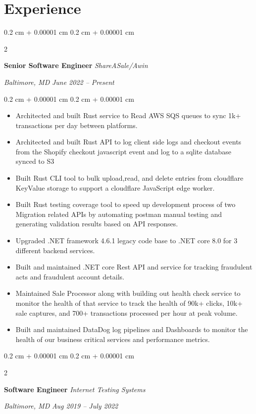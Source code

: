 \documentclass[10pt, letterpaper]{article}
\newenvironment{highlights}{
    \begin{itemize}[
        topsep=0.10 cm,
        parsep=0.10 cm,
        partopsep=0pt,
        itemsep=0pt,
        leftmargin=0.4 cm + 10pt
        ]
    }{
\end{itemize}
} %
\newenvironment{onecolentry}{
    \begin{adjustwidth}{
            0.2 cm + 0.00001 cm
        }{
            0.2 cm + 0.00001 cm
        }
    }{
    \end{adjustwidth}
} %
\newenvironment{twocolentry}[2][]{
    \onecolentry
    \def\secondColumn{#2}
    \setcolumnwidth{\fill, 10.5 cm}
    \begin{paracol}{2}
    }{
        \switchcolumn \raggedleft \secondColumn
    \end{paracol}
    \endonecolentry
} %
\begin{document}
\section{Experience}
\begin{twocolentry}{
    \textit{Baltimore, MD}
    \textit{June 2022 – Present}}
    \textbf{Senior Software Engineer}
    \textit{ShareASale/Awin}
\end{twocolentry}
\begin{onecolentry}
    \begin{highlights}
        \item Architected and built Rust service to Read AWS SQS queues to sync 1k+ transactions per day between platforms.
        \item Architected and built Rust API to log client side logs and checkout events from the Shopify checkout javascript event and log to a sqlite database synced to S3
        \item Built Rust CLI tool to bulk upload,read, and delete entries from cloudflare KeyValue storage to support a cloudflare JavaScript edge worker.
        \item Built Rust testing coverage tool to speed up development process of two Migration related APIs by automating postman manual testing and generating validation results based on API responses.
        \item Upgraded .NET framework 4.6.1 legacy code base to .NET core 8.0 for 3 different backend services.
        \item Built and maintained .NET core Rest API and service for tracking fraudulent acts and fraudulent account details.
        \item Maintained Sale Processor along with building out health check service to monitor the health of that service to track the health of 90k+ clicks, 10k+ sale captures, and 700+ transactions processed per hour at peak volume.
        \item Built and maintained DataDog log pipelines and Dashboards to monitor the health of our business critical services and performance metrics.
        \end{highlights}
    \end{onecolentry}
    \vspace{0.2 cm}
    \begin{twocolentry}{
            \textit{Baltimore, MD}
        \textit{Aug 2019 – July 2022}}
        \textbf{Software Engineer}
        \textit{Internet Testing Systems}
    \end{twocolentry}
\end{document}
